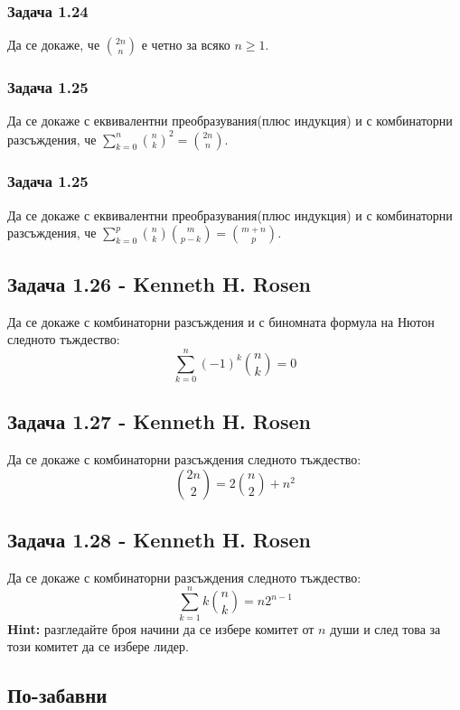 \documentclass[12pt]{article}
\begin{document}
\subsubsection*{Задача 1.24}
Да се докаже, че $\binom{2n}{n}$ е четно за всяко $n \geq 1$.

\subsubsection*{Задача 1.25}
Да се докаже с еквивалентни преобразувания(плюс индукция) и с комбинаторни разсъждения, че $\displaystyle\sum_{k=0}^n {\binom{n}{k}}^2 = \binom{2n}{n}$.

\subsubsection*{Задача 1.25}
Да се докаже с еквивалентни преобразувания(плюс индукция) и с комбинаторни разсъждения, че $\displaystyle\sum_{k=0}^p \binom{n}{k}\binom{m}{p-k} = \binom{m+n}{p}$.

\subsection*{Задача 1.26 - Kenneth H. Rosen}
Да се докаже с комбинаторни разсъждения и с биномната формула на Нютон следното тъждество:
\begin{equation*}
    \displaystyle\sum_{k=0}^{n} {(-1)^k \binom{n}{k}} = 0
\end{equation*}
\subsection*{Задача 1.27 - Kenneth H. Rosen}
Да се докаже с комбинаторни разсъждения следното тъждество:
\begin{equation*}
    \binom{2n}{2} = 2 \binom{n}{2} + n^2
\end{equation*}
\subsection*{Задача 1.28 - Kenneth H. Rosen}
Да се докаже с комбинаторни разсъждения следното тъждество:
\begin{equation*}
    \displaystyle\sum_{k=1}^{n} {k \binom{n}{k}} = n 2^{n-1}
\end{equation*}
\textbf{Hint: } разгледайте броя начини да се избере комитет от $n$ души и след това за този комитет да се избере лидер.

\subsection*{По-забавни}
\end{document}
